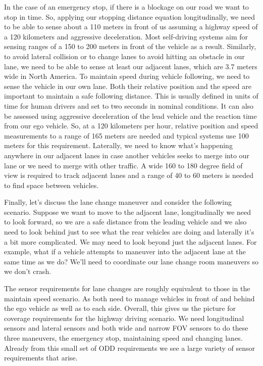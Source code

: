 In the case of an emergency stop, if there is a blockage on our road we want to stop in time. 
So, applying our stopping distance equation longitudinally, we need to be able to sense about a 110 meters in front of us assuming a highway speed of a 120 kilometers and aggressive deceleration. 
Most self-driving systems aim for sensing ranges of a 150 to 200 meters in front of the vehicle as a result. 
Similarly, to avoid lateral collision or to change lanes to avoid hitting an obstacle in our lane, we need to be able to sense at least our adjacent lanes, 
which are 3.7 meters wide in North America. To maintain speed during vehicle following, we need to sense the vehicle in our own lane. 
Both their relative position and the speed are important to maintain a safe following distance. 
This is usually defined in units of time for human drivers and set to two seconds in nominal conditions. 
It can also be assessed using aggressive deceleration of the lead vehicle and the reaction time from our ego vehicle. 
So, at a 120 kilometers per hour, relative position and speed measurements to a range of 165 meters are needed and typical systems use 100 meters for this requirement. 
Laterally, we need to know what's happening anywhere in our adjacent lanes in case another vehicles seeks to merge into our lane or we need to merge with other traffic. 
A wide 160 to 180 degree field of view is required to track adjacent lanes and a range of 40 to 60 meters is needed to find space between vehicles. 

Finally, let's discuss the lane change maneuver and consider the following scenario. 
Suppose we want to move to the adjacent lane, longitudinally we need to look forward, so we are a safe distance from the leading vehicle and 
we also need to look behind just to see what the rear vehicles are doing and laterally it's a bit more complicated. 
We may need to look beyond just the adjacent lanes. For example, what if a vehicle attempts to maneuver into the adjacent lane at the same time as we do? 
We'll need to coordinate our lane change room maneuvers so we don't crash. 

The sensor requirements for lane changes are roughly equivalent to those in the maintain speed scenario. 
As both need to manage vehicles in front of and behind the ego vehicle as well as to each side. 
Overall, this gives us the picture for coverage requirements for the highway driving scenario. 
We need longitudinal sensors and lateral sensors and both wide and narrow FOV sensors to do these three maneuvers, the emergency stop, maintaining speed and changing lanes. 
Already from this small set of ODD requirements we see a large variety of sensor requirements that arise. 

